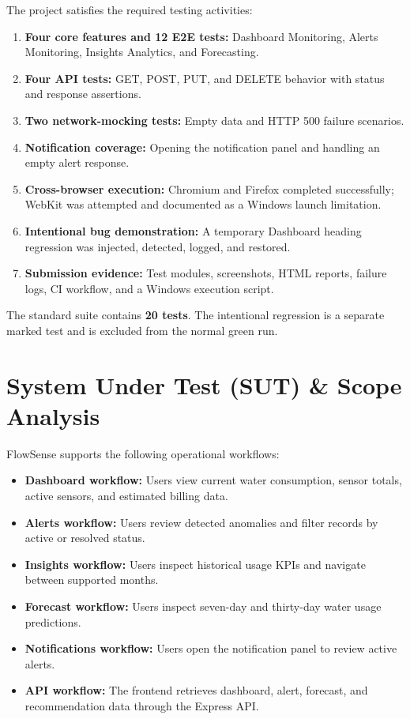 \documentclass[11pt,a4paper]{article}
\begin{document}
The project satisfies the required testing activities:

\begin{enumerate}[leftmargin=*]
    \item \textbf{Four core features and 12 E2E tests:} Dashboard Monitoring, Alerts Monitoring, Insights Analytics, and Forecasting.
    \item \textbf{Four API tests:} GET, POST, PUT, and DELETE behavior with status and response assertions.
    \item \textbf{Two network-mocking tests:} Empty data and HTTP 500 failure scenarios.
    \item \textbf{Notification coverage:} Opening the notification panel and handling an empty alert response.
    \item \textbf{Cross-browser execution:} Chromium and Firefox completed successfully; WebKit was attempted and documented as a Windows launch limitation.
    \item \textbf{Intentional bug demonstration:} A temporary Dashboard heading regression was injected, detected, logged, and restored.
    \item \textbf{Submission evidence:} Test modules, screenshots, HTML reports, failure logs, CI workflow, and a Windows execution script.
\end{enumerate}

The standard suite contains \textbf{20 tests}. The intentional regression is a separate marked test and is excluded from the normal green run.

\section{System Under Test (SUT) \& Scope Analysis}

FlowSense supports the following operational workflows:

\begin{itemize}[leftmargin=*]
    \item \textbf{Dashboard workflow:} Users view current water consumption, sensor totals, active sensors, and estimated billing data.
    \item \textbf{Alerts workflow:} Users review detected anomalies and filter records by active or resolved status.
    \item \textbf{Insights workflow:} Users inspect historical usage KPIs and navigate between supported months.
    \item \textbf{Forecast workflow:} Users inspect seven-day and thirty-day water usage predictions.
    \item \textbf{Notifications workflow:} Users open the notification panel to review active alerts.
    \item \textbf{API workflow:} The frontend retrieves dashboard, alert, forecast, and recommendation data through the Express API.
\end{itemize}
\end{document}
